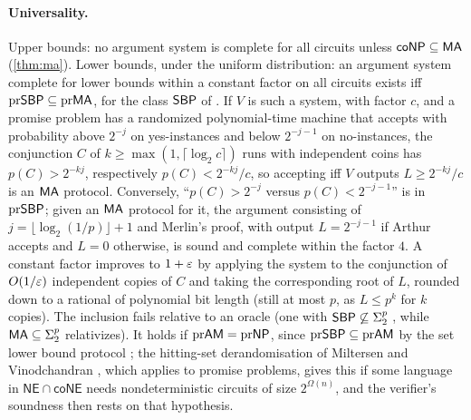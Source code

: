 \paragraph{Universality.} Upper bounds: no argument system is complete for all
circuits unless $\mathsf{coNP}\subseteq\mathsf{MA}$ (\cref{thm:ma}). Lower bounds, under the uniform
distribution: an argument system complete for lower bounds within a constant factor
on all circuits exists iff $\mathrm{pr}\mathsf{SBP}\subseteq\mathrm{pr}\mathsf{MA}$, for the class
$\mathsf{SBP}$ of \cite{bgm2006}. If $V$ is such a system, with factor $c$, and a promise
problem has a randomized polynomial-time machine that accepts with probability
above $2^{-j}$ on yes-instances and below $2^{-j-1}$ on no-instances, the
conjunction $C$ of $k\ge\max(1,\lceil\log_2c\rceil)$ runs with independent coins
has $p(C)>2^{-kj}$, respectively $p(C)<2^{-kj}/c$, so accepting iff $V$ outputs
$L\ge2^{-kj}/c$ is an $\mathsf{MA}$ protocol.
Conversely, ``$p(C)>2^{-j}$ versus $p(C)<2^{-j-1}$'' is in $\mathrm{pr}\mathsf{SBP}$; given
an $\mathsf{MA}$ protocol for it, the argument consisting of $j=\lfloor\log_2(1/p)\rfloor+1$
and Merlin's proof, with output $L=2^{-j-1}$ if Arthur accepts and $L=0$ otherwise,
is sound and complete within the factor $4$. A constant factor improves to $1+\varepsilon$
by applying the system to the conjunction of $O(1/\varepsilon)$ independent copies of $C$
and taking the corresponding root of $L$, rounded down to a rational of polynomial bit
length (still at most $p$, as $L\le p^k$ for $k$ copies). The inclusion fails relative to an oracle
(one with $\mathsf{SBP}\not\subseteq\Sigma_2^p$ \cite{bgm2006}, while $\mathsf{MA}\subseteq\Sigma_2^p$
relativizes). It holds if $\mathrm{pr}\mathsf{AM}=\mathrm{pr}\mathsf{NP}$, since
$\mathrm{pr}\mathsf{SBP}\subseteq\mathrm{pr}\mathsf{AM}$ by the set lower bound protocol
\cite{gs1986}; the hitting-set derandomisation of Miltersen and Vinodchandran
\cite{mv2005}, which applies to promise problems, gives this if some language in
$\mathsf{NE}\cap\mathsf{coNE}$ needs nondeterministic circuits of size
$2^{\Omega(n)}$, and the verifier's soundness then rests on that hypothesis.
